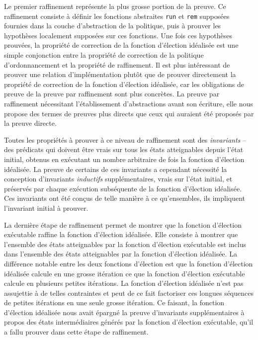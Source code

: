 	\label{sec:proof_insight}

	Le premier raffinement représente la plus grosse portion de la preuve. Ce raffinement consiste à définir les fonctions abstraites \texttt{run} et \texttt{rem} supposées fournies dans la couche d'abstraction de la politique, puis à prouver les hypothèses localement supposées sur ces fonctions.
		Une fois ces hypothèses prouvées, la propriété de correction de la fonction d'élection idéalisée est une simple conjonction entre la propriété de correction de la politique d'ordonnancement et la propriété de raffinement. Il est plus intéressant de prouver une relation d'implémentation plutôt que de prouver directement la propriété de correction de la fonction d'élection idéalisée, car les obligations de preuve de la preuve par raffinement sont plus concrètes. La preuve par raffinement nécessitant l'établissement d'abstractions avant son écriture, elle nous propose des termes de preuves plus directs que ceux qui auraient été proposés par la preuve directe.

	Toutes les propriétés à prouver à ce niveau de raffinement sont des \emph{invariants} -- des prédicats qui doivent être vrais sur tous les états atteignables depuis l'état initial, obtenus en exécutant un nombre arbitraire de fois la fonction d'élection idéalisée. La preuve de certains de ces invariants a cependant nécessité la conception d'invariants \emph{inductifs} supplémentaires, vrais sur l'état initial, et préservés par chaque exécution subséquente de la fonction d'élection idéalisée. Ces invariants ont été conçus de telle manière à ce qu'ensembles, ils impliquent l'invariant initial à prouver.

	La dernière étape de raffinement permet de montrer que la fonction d'élection exécutable raffine la fonction d'élection idéalisée. Elle consiste à montrer que l'ensemble des états atteignables par la fonction d'élection exécutable est inclus dans l'ensemble des états atteignables par la fonction d'élection idéalisée. 
	La différence notable entre les deux fonctions d'élection est que la fonction d'élection idéalisée calcule en une grosse itération ce que la fonction d'élection exécutable calcule en plusieurs petites itérations. La fonction d'élection idéalisée n'est pas assujettie à de telles contraintes et peut de ce fait factoriser ces longues séquences de petites itérations en une seule grosse itération. Ce faisant, la fonction d'élection idéalisée nous avait épargné la preuve d'invariants supplémentaires à propos des états intermédiaires générés par la fonction d'élection exécutable, qu'il a fallu prouver dans cette étape de raffinement.

